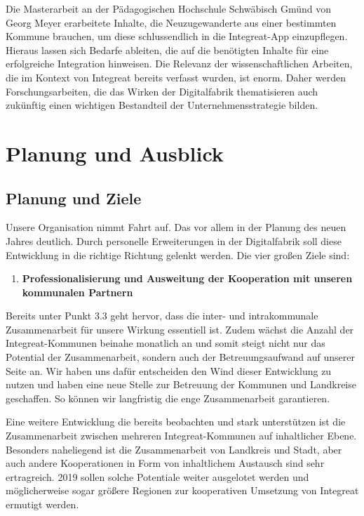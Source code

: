 \documentclass[12pt, a4paper]{article} %
\begin{document}
Die Masterarbeit an der Pädagogischen Hochschule Schwäbisch Gmünd von
Georg Meyer erarbeitete Inhalte, die Neuzugewanderte aus einer
bestimmten Kommune brauchen, um diese schlussendlich in die
Integreat-App einzupflegen. Hieraus lassen sich Bedarfe ableiten, die
auf die benötigten Inhalte für eine erfolgreiche Integration hinweisen.
Die Relevanz der wissenschaftlichen Arbeiten, die im Kontext von
Integreat bereits verfasst wurden, ist enorm. Daher werden
Forschungsarbeiten, die das Wirken der Digitalfabrik thematisieren auch
zukünftig einen wichtigen Bestandteil der Unternehmensstrategie bilden.

\hypertarget{planung-und-ausblick}{%
\section{Planung und Ausblick}\label{planung-und-ausblick}}

\hypertarget{planung-und-ziele}{%
\subsection{Planung und Ziele}\label{planung-und-ziele}}

Unsere Organisation nimmt Fahrt auf. Das vor allem in der Planung des
neuen Jahres deutlich. Durch personelle Erweiterungen in der
Digitalfabrik soll diese Entwicklung in die richtige Richtung gelenkt
werden. Die vier großen Ziele sind:

\begin{enumerate}
\def\labelenumi{\arabic{enumi}.}
\item
\textbf{Professionalisierung und Ausweitung der Kooperation mit
unseren kommunalen Partnern}
\end{enumerate}

Bereits unter Punkt 3.3 geht hervor, dass die inter- und intrakommunale
Zusammenarbeit für unsere Wirkung essentiell ist. Zudem wächst die
Anzahl der Integreat-Kommunen beinahe monatlich an und somit steigt
nicht nur das Potential der Zusammenarbeit, sondern auch der
Betreuungsaufwand auf unserer Seite an. Wir haben uns dafür entscheiden
den Wind dieser Entwicklung zu nutzen und haben eine neue Stelle zur
Betreuung der Kommunen und Landkreise geschaffen. So können wir
langfristig die enge Zusammenarbeit garantieren.

Eine weitere Entwicklung die bereits beobachten und stark unterstützen
ist die Zusammenarbeit zwischen mehreren Integreat-Kommunen auf
inhaltlicher Ebene. Besonders naheliegend ist die Zusammenarbeit von
Landkreis und Stadt, aber auch andere Kooperationen in Form von
inhaltlichem Austausch sind sehr ertragreich. 2019 sollen solche
Potentiale weiter ausgelotet werden und möglicherweise sogar größere
Regionen zur kooperativen Umsetzung von Integreat ermutigt werden.
\end{document}
